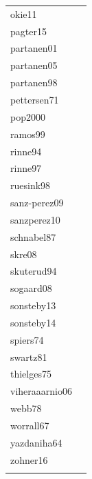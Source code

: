 \documentclass[11pt]{article}
\begin{document}
\begin{footnotesize}
\begin{longtable}{p{}p{}}
  okie11 & \citep{Okie:2011aa} \\ 
  pagter15 & \citep{Pagter:2015} \\ 
  partanen01 & \citep{Partanen:2001aa} \\ 
  partanen05 & \citep{Partanen:2005aa} \\ 
  partanen98 & \citep{Partanen:1998aa} \\ 
  pettersen71 & \citep{Pettersen:1972aa} \\ 
  pop2000 & \citep{Pop:2000aa} \\ 
  ramos99 & \citep{ramos:1999} \\ 
  rinne94 & \citep{Rinne:1994} \\ 
  rinne97 & \citep{Rinne:1997aa} \\ 
  ruesink98 & \citep{Ruesink:1998aa} \\ 
  sanz-perez09 & \citep{Sanz-Perez:2009aa} \\ 
  sanzperez10 & \citep{Sanz-Perez:2010aa} \\ 
  schnabel87 & \citep{Schnabel:1987aa} \\ 
  skre08 & \citep{Skre:2008aa} \\ 
  skuterud94 & \citep{Skuterud:1994aa} \\ 
  sogaard08 & \citep{Sogaard:2008aa} \\ 
  sonsteby13 & \citep{Sonsteby:2013aa} \\ 
  sonsteby14 & \citep{Sonsteby:2014aa} \\ 
  spiers74 & \citep{Spiers:1974aa} \\ 
  swartz81 & \citep{Swartz:1981aa} \\ 
  thielges75 & \citep{Thielges:1976aa} \\ 
  viheraaarnio06 & \citep{Vihera-Aarnio:2006aa} \\ 
  webb78 & \citep{Webb:1977} \\ 
  worrall67 & \citep{Worrall:1967aa} \\ 
  yazdaniha64 & \citep{Yazdaniha:1967aa} \\ 
  zohner16 & \citep{zohner2016} \\ 
  \hline
\label{tab:ref}
\end{longtable}
\endgroup\end{footnotesize} 

\pagebreak
\end{document}
